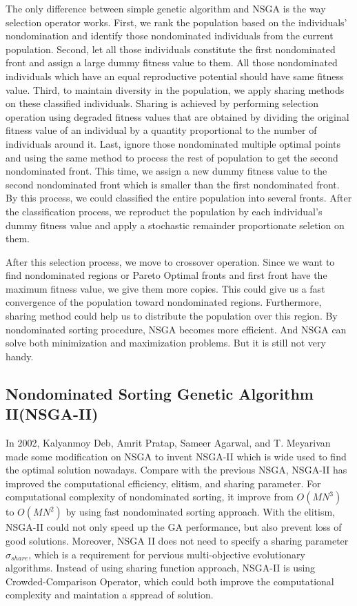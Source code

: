 The only difference between simple genetic algorithm and NSGA is the way selection operator works. First, we rank the population based on the individuals' nondomination and identify those nondominated individuals from the current population. Second, let all those individuals constitute the first nondominated front and assign a large dummy fitness value to them. All those nondominated individuals which have an equal reproductive potential should have same fitness value. Third, to maintain diversity in the population, we apply sharing methods\cite{Deb_1989_Investigation}\cite{Deb_1989_Genetic} on these classified individuals. Sharing is achieved by performing selection operation using degraded fitness values that are obtained by dividing the original fitness value of an individual by a quantity proportional to the number of individuals around it. Last, ignore those nondominated multiple optimal points and using the same method to process the rest of population to get the second nondominated front. This time, we assign a new dummy fitness value to the second nondominated front which is smaller than the first nondominated front. By this process, we could classified the entire population into several fronts. After the classification process, we reproduct the population by each individual's dummy fitness value and apply a stochastic remainder proportionate seletion on them.

After this selection process, we move to crossover operation. Since we want to find nondominated regions or Pareto Optimal fronts and first front have the maximum fitness value, we give them more copies. This could give us a fast convergence of the population toward nondominated regions. Furthermore, sharing method could help us to distribute the population over this region. By nondominated sorting procedure, NSGA becomes more efficient. And NSGA can solve both minimization and maximization problems. But it is still not very handy.

\subsection{Nondominated Sorting Genetic Algorithm II(NSGA-II)}
In 2002, Kalyanmoy Deb, Amrit Pratap, Sameer Agarwal, and T. Meyarivan made some modification on NSGA to invent NSGA-II\cite{NSGA-II} which is wide used  to find the optimal solution nowadays. Compare with the previous NSGA, NSGA-II has improved the computational efficiency, elitism, and sharing parameter. For computational complexity of nondominated sorting, it improve from \(O(MN^{3})\) to \(O(MN^{2})\) by using fast nondominated sorting approach\cite{NSGA-II}. With the elitism, NSGA-II could not only speed up the GA performance, but also prevent loss of good solutions. Moreover, NSGA II does not need to specify a sharing parameter \(\sigma_{share}\), which is a requirement for pervious multi-objective evolutionary algorithms. Instead of using sharing function approach, NSGA-II is using Crowded-Comparison Operator, which could both improve the computational complexity and maintation a sppread of solution.


